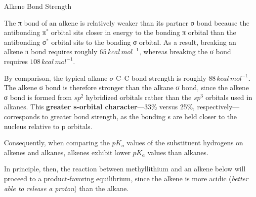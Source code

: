 \documentclass[10pt]{article}
\begin{document}
  \begin{core}{Alkene Bond Strength}

    The π bond of an alkene is relatively weaker than its partner σ bond because the antibonding π$^*$ orbital sits closer in energy to the bonding π orbital than the antibonding σ$^*$ orbital sits to the bonding σ orbital. As a result, breaking an alkene π bond requires roughly $65\,kcal\,mol^{-1}$, whereas breaking the σ bond requires $108\,kcal\,mol^{-1}$.


    By comparison, the typical alkane $\sigma$ C--C bond strength is roughly $88\,kcal\,mol^{-1}$. The alkene σ bond is therefore stronger than the alkane σ bond, since the alkene σ bond is formed from $sp^2$ hybridized orbitals rather than the $sp^3$ orbitals used in alkanes. This \textbf{greater s-orbital character}---33\% versus 25\%, respectively---corresponds to greater bond strength, as the bonding s are held closer to the nucleus relative to p orbitals.

    Consequently, when comparing the $pK_a$ values of the substituent hydrogens on alkenes and alkanes, alkenes exhibit lower $pK_a$ values than alkanes.


    In principle, then, the reaction between methyllithium and an alkene below will proceed to a product-favoring equilibrium, since the alkene is more acidic (\textit{better able to release a proton}) than the alkane.


\end{core}
\end{document}
